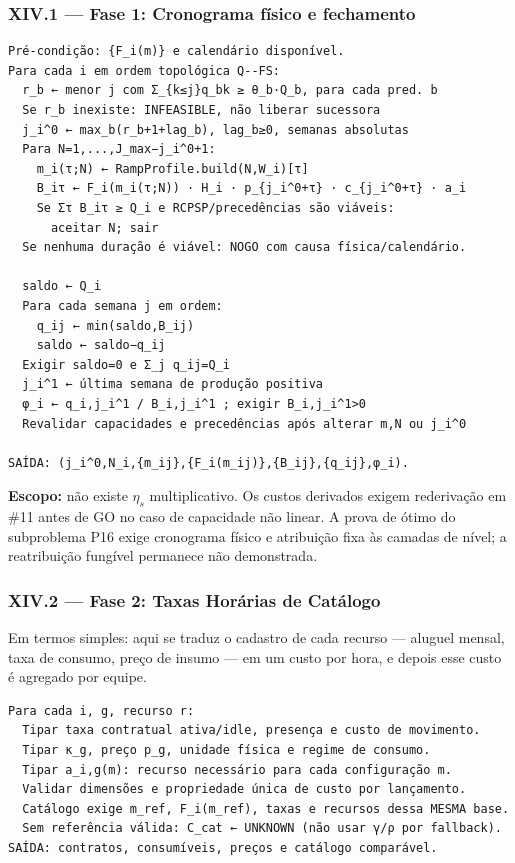 \documentclass[
  10pt,
]{article}
\begin{document}
\hypertarget{xiv.1-fase-1-cronograma-interface-com-solver-rcpsp-externo}{%
\subsubsection{XIV.1 --- Fase 1: Cronograma físico e
fechamento}\label{xiv.1-fase-1-cronograma-interface-com-solver-rcpsp-externo}}

\begin{verbatim}
Pré-condição: {F_i(m)} e calendário disponível.
Para cada i em ordem topológica Q--FS:
  r_b ← menor j com Σ_{k≤j}q_bk ≥ θ_b·Q_b, para cada pred. b
  Se r_b inexiste: INFEASIBLE, não liberar sucessora
  j_i^0 ← max_b(r_b+1+lag_b), lag_b≥0, semanas absolutas
  Para N=1,...,J_max−j_i^0+1:
    m_i(τ;N) ← RampProfile.build(N,W_i)[τ]
    B_iτ ← F_i(m_i(τ;N)) · H_i · p_{j_i^0+τ} · c_{j_i^0+τ} · a_i
    Se Στ B_iτ ≥ Q_i e RCPSP/precedências são viáveis:
      aceitar N; sair
  Se nenhuma duração é viável: NOGO com causa física/calendário.

  saldo ← Q_i
  Para cada semana j em ordem:
    q_ij ← min(saldo,B_ij)
    saldo ← saldo−q_ij
  Exigir saldo=0 e Σ_j q_ij=Q_i
  j_i^1 ← última semana de produção positiva
  φ_i ← q_i,j_i^1 / B_i,j_i^1 ; exigir B_i,j_i^1>0
  Revalidar capacidades e precedências após alterar m,N ou j_i^0

SAÍDA: (j_i^0,N_i,{m_ij},{F_i(m_ij)},{B_ij},{q_ij},φ_i).
\end{verbatim}

\noindent\textbf{Escopo:} não existe \(\eta_s\) multiplicativo.
Os custos derivados exigem rederivação em \#11 antes de GO no
caso de capacidade não linear. A prova de ótimo do subproblema P16 exige cronograma físico e atribuição fixa às camadas de nível; a reatribuição fungível permanece não demonstrada.

\hypertarget{xiv.2-fase-2-taxas-horuxe1rias-de-catuxe1logo}{%
\subsubsection{XIV.2 --- Fase 2: Taxas Horárias de
Catálogo}\label{xiv.2-fase-2-taxas-horuxe1rias-de-catuxe1logo}}

Em termos simples: aqui se traduz o cadastro de cada recurso --- aluguel
mensal, taxa de consumo, preço de insumo --- em um custo por hora, e
depois esse custo é agregado por equipe.

\begin{verbatim}
Para cada i, g, recurso r:
  Tipar taxa contratual ativa/idle, presença e custo de movimento.
  Tipar κ_g, preço p_g, unidade física e regime de consumo.
  Tipar a_i,g(m): recurso necessário para cada configuração m.
  Validar dimensões e propriedade única de custo por lançamento.
  Catálogo exige m_ref, F_i(m_ref), taxas e recursos dessa MESMA base.
  Sem referência válida: C_cat ← UNKNOWN (não usar γ/ρ por fallback).
SAÍDA: contratos, consumíveis, preços e catálogo comparável.
\end{verbatim}
\end{document}

